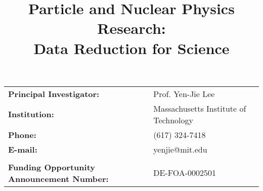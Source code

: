 \begin{titlepage}
\vspace{2.2 cm}
\title{\textbf{Particle and Nuclear Physics Research: \\
Data Reduction for Science\\
}}

\vspace{.2 cm} 

\begin{center}
\begin{tabular}{ll}
 
\textbf{Principal Investigator:} & Prof. Yen-Jie Lee \\
\textbf{Institution:}                    & Massachusetts Institute of Technology \\
\textbf{Phone:} & 			(617) 324-7418 \\
\textbf{E-mail:} & 			yenjie@mit.edu \\
& \\
\textbf{Funding Opportunity Announcement Number:} & 	DE-FOA-0002501 \\

\end{tabular}
\end{center}



\end{titlepage}





